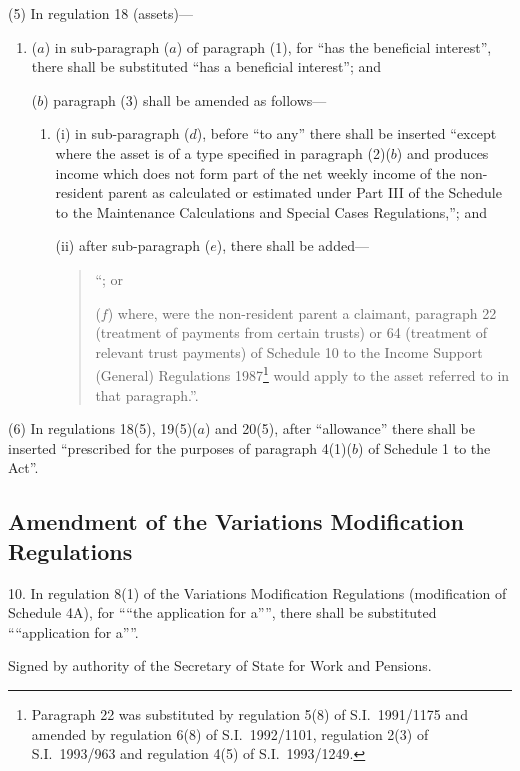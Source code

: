 \documentclass[12pt,a4paper]{article}
\begin{document}
(5) In regulation 18 (assets)—
\begin{enumerate}\item[]
($a$) in sub-paragraph ($a$)  of paragraph (1), for “has the beneficial interest”, there shall be substituted “has a beneficial interest”; and

($b$) paragraph (3) shall be amended as follows—
\begin{enumerate}\item[]
(i) in sub-paragraph ($d$), before “to any” there shall be inserted “except where the asset is of a type specified in paragraph (2)($b$)  and produces income which does not form part of the net weekly income of the non-resident parent as calculated or estimated under Part III of the Schedule to the Maintenance Calculations and Special Cases Regulations,”; and

(ii) after sub-paragraph ($e$), there shall be added—
\begin{quotation}
    “; or

    ($f$) 
    where, were the non-resident parent a claimant, paragraph 22 (treatment of payments from certain trusts) or 64 (treatment of relevant trust payments) of Schedule 10 to the Income Support (General) Regulations 1987\footnote{Paragraph 22 was substituted by regulation 5(8) of S.I.\ 1991/1175 and amended by regulation 6(8) of S.I.\ 1992/1101, regulation 2(3) of S.I.\ 1993/963 and regulation 4(5) of S.I.\ 1993/1249.} would apply to the asset referred to in that paragraph.”. 
\end{quotation}
\end{enumerate}
\end{enumerate}

(6) In regulations 18(5), 19(5)($a$)  and 20(5), after “allowance” there shall be inserted “prescribed for the purposes of paragraph 4(1)($b$)  of Schedule 1 to the Act”.

\subsection[10. Amendment of the Variations Modification Regulations]{Amendment of the Variations Modification Regulations}

10.  In regulation 8(1) of the Variations Modification Regulations (modification of Schedule 4A), for ““the application for a””, there shall be substituted ““application for a””. 

\bigskip

Signed 
by authority of the Secretary of State for Work and Pensions.
\end{document}
